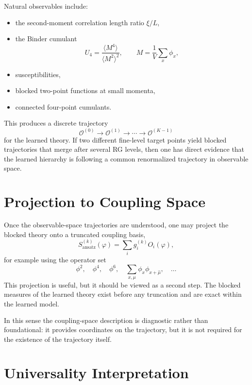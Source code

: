 \documentclass[aps,prd,reprint,nofootinbib,superscriptaddress,longbibliography]{revtex4-2}
\begin{document}
Natural observables include:
\begin{itemize}
\item the second-moment correlation length ratio $\xi/L$,
\item the Binder cumulant
\begin{equation}
U_4 = \frac{\langle M^4\rangle}{\langle M^2\rangle^2},
\qquad
M = \frac{1}{V}\sum_x \phi_x,
\end{equation}
\item susceptibilities,
\item blocked two-point functions at small momenta,
\item connected four-point cumulants.
\end{itemize}

This produces a discrete trajectory
\begin{equation}
\mathcal O^{(0)} \to \mathcal O^{(1)} \to \cdots \to \mathcal O^{(K-1)}
\end{equation}
for the learned theory. If two different fine-level target points yield blocked
trajectories that merge after several RG levels, then one has direct evidence
that the learned hierarchy is following a common renormalized trajectory in
observable space.

\section{Projection to Coupling Space}
\label{sec:coupling_space}

Once the observable-space trajectories are understood, one may project the
blocked theory onto a truncated coupling basis,
\begin{equation}
S_{\mathrm{ansatz}}^{(k)}(\varphi)
=
\sum_i g_i^{(k)} O_i(\varphi),
\end{equation}
for example using the operator set
\begin{equation}
\phi^2,\quad \phi^4,\quad \phi^6,\quad
\sum_{x,\mu} \phi_x \phi_{x+\hat\mu},
\quad \ldots
\end{equation}
This projection is useful, but it should be viewed as a second step. The
blocked measures of the learned theory exist before any truncation and are exact
within the learned model.

In this sense the coupling-space description is diagnostic rather than
foundational: it provides coordinates on the trajectory, but it is not required
for the existence of the trajectory itself.

\section{Universality Interpretation}
\label{sec:universality}
\end{document}
